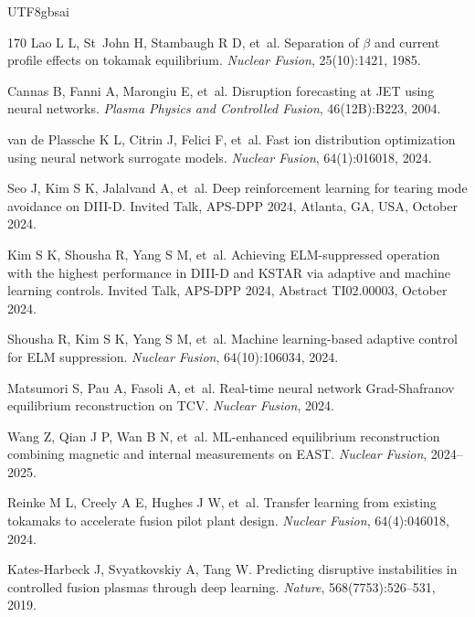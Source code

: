 \documentclass[12pt,a4paper]{article}
\begin{document}
\begin{CJK}{UTF8}{gbsai}
\begin{thebibliography}{170}
Lao L L, St~John H, Stambaugh R D, et~al.
\newblock Separation of $\beta$ and current profile effects on tokamak equilibrium.
\newblock \textit{Nuclear Fusion}, 25(10):1421, 1985.

Cannas B, Fanni A, Marongiu E, et~al.
\newblock Disruption forecasting at JET using neural networks.
\newblock \textit{Plasma Physics and Controlled Fusion}, 46(12B):B223, 2004.

van de Plassche K L, Citrin J, Felici F, et~al.
\newblock Fast ion distribution optimization using neural network surrogate models.
\newblock \textit{Nuclear Fusion}, 64(1):016018, 2024.

Seo J, Kim S K, Jalalvand A, et~al.
\newblock Deep reinforcement learning for tearing mode avoidance on DIII-D.
\newblock Invited Talk, APS-DPP 2024, Atlanta, GA, USA, October 2024.

Kim S K, Shousha R, Yang S M, et~al.
\newblock Achieving ELM-suppressed operation with the highest performance in DIII-D and KSTAR via adaptive and machine learning controls.
\newblock Invited Talk, APS-DPP 2024, Abstract TI02.00003, October 2024.

Shousha R, Kim S K, Yang S M, et~al.
\newblock Machine learning-based adaptive control for ELM suppression.
\newblock \textit{Nuclear Fusion}, 64(10):106034, 2024.

Matsumori S, Pau A, Fasoli A, et~al.
\newblock Real-time neural network Grad-Shafranov equilibrium reconstruction on TCV.
\newblock \textit{Nuclear Fusion}, 2024.

Wang Z, Qian J P, Wan B N, et~al.
\newblock ML-enhanced equilibrium reconstruction combining magnetic and internal measurements on EAST.
\newblock \textit{Nuclear Fusion}, 2024--2025.

Reinke M L, Creely A E, Hughes J W, et~al.
\newblock Transfer learning from existing tokamaks to accelerate fusion pilot plant design.
\newblock \textit{Nuclear Fusion}, 64(4):046018, 2024.

Kates-Harbeck J, Svyatkovskiy A, Tang W.
\newblock Predicting disruptive instabilities in controlled fusion plasmas through deep learning.
\newblock \textit{Nature}, 568(7753):526--531, 2019.


\end{thebibliography}
\end{CJK}
\end{document}
